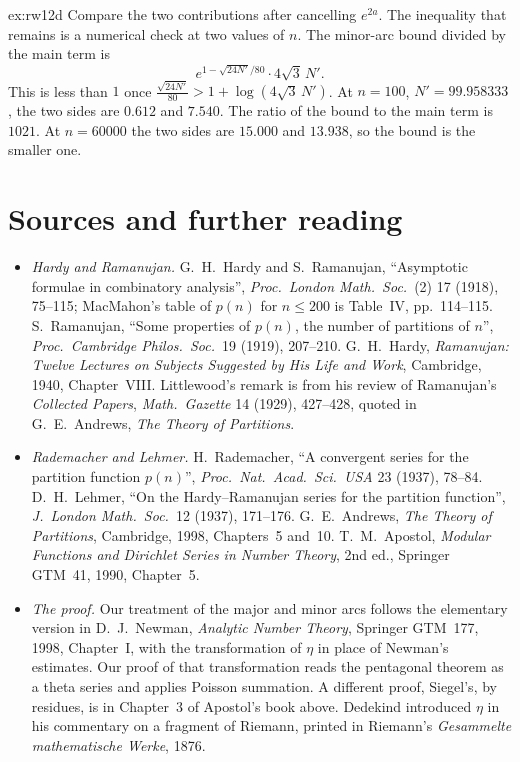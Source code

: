 \begin{solution}{ex:rw12d}
\idea Compare the two contributions after cancelling $e^{2a}$. The inequality that remains is a numerical check at two values of $n$.
\writeup The minor-arc bound divided by the main term is
\[
e^{1-\sqrt{24N'}/80}\cdot 4\sqrt3\,N'.
\]
This is less than $1$ once $\frac{\sqrt{24N'}}{80}>1+\log(4\sqrt3\,N')$. At $n=100$, $N'=99.958333$, the two sides are $0.612$ and $7.540$. The ratio of the bound to the main term is $1021$. At $n=60000$ the two sides are $15.000$ and $13.938$, so the bound is the smaller one.
\end{solution}

\section*{Sources and further reading}

\begin{itemize}
\item \emph{Hardy and Ramanujan.} G.~H.~Hardy and S.~Ramanujan, ``Asymptotic formulae in combinatory analysis'', \emph{Proc.\ London Math.\ Soc.}\ (2) 17 (1918), 75--115; MacMahon's table of $p(n)$ for $n\le200$ is Table~IV, pp.~114--115. S.~Ramanujan, ``Some properties of $p(n)$, the number of partitions of $n$'', \emph{Proc.\ Cambridge Philos.\ Soc.}\ 19 (1919), 207--210. G.~H.~Hardy, \emph{Ramanujan: Twelve Lectures on Subjects Suggested by His Life and Work}, Cambridge, 1940, Chapter~VIII. Littlewood's remark is from his review of Ramanujan's \emph{Collected Papers}, \emph{Math.\ Gazette} 14 (1929), 427--428, quoted in G.~E.~Andrews, \emph{The Theory of Partitions}.
\item \emph{Rademacher and Lehmer.} H.~Rademacher, ``A convergent series for the partition function $p(n)$'', \emph{Proc.\ Nat.\ Acad.\ Sci.\ USA} 23 (1937), 78--84. D.~H.~Lehmer, ``On the Hardy--Ramanujan series for the partition function'', \emph{J.\ London Math.\ Soc.}\ 12 (1937), 171--176. G.~E.~Andrews, \emph{The Theory of Partitions}, Cambridge, 1998, Chapters~5 and~10. T.~M.~Apostol, \emph{Modular Functions and Dirichlet Series in Number Theory}, 2nd ed., Springer GTM~41, 1990, Chapter~5.
\item \emph{The proof.} Our treatment of the major and minor arcs follows the elementary version in D.~J.~Newman, \emph{Analytic Number Theory}, Springer GTM~177, 1998, Chapter~I, with the transformation of $\eta$ in place of Newman's estimates. Our proof of that transformation reads the pentagonal theorem as a theta series and applies Poisson summation. A different proof, Siegel's, by residues, is in Chapter~3 of Apostol's book above. Dedekind introduced $\eta$ in his commentary on a fragment of Riemann, printed in Riemann's \emph{Gesammelte mathematische Werke}, 1876.
\end{itemize}
